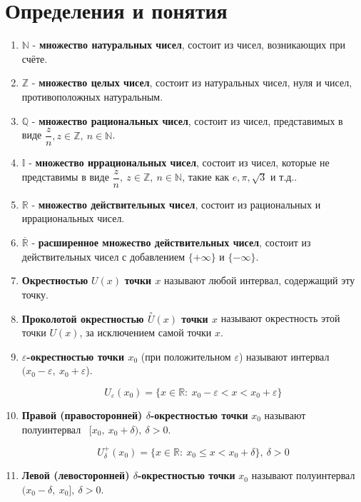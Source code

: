 

\renewcommand{\copyright}{fiixii, pluttan}
    
    
\toc 
\section*{Определения и понятия}
\begin{enumerate}

\item $\mathbb{N}$ - \textbf{множество натуральных чисел}, состоит из чисел, возникающих при счёте.
\item $\mathbb{Z}$ - \textbf{множество целых чисел}, состоит из натуральных чисел, нуля и чисел, противоположных натуральным.
\item $\mathbb{Q}$ - \textbf{множество рациональных чисел}, состоит из чисел, представимых в виде ${\dfrac{z}{n}}, z \in \mathbb{Z}, \ n \in \mathbb{N}$.
\item $\mathbb{I}$ - \textbf{множество иррациональных чисел}, состоит из чисел, которые не представимы в виде ${\dfrac{z}{n}}, \ z \in \mathbb{Z}, \ n \in \mathbb{N}$, такие как $e, \pi, \sqrt{3}$ и т.д..
\item $\mathbb{R}$ - \textbf{множество действительных чисел}, состоит из рациональных и иррациональных чисел.
\item $\overline{\mathbb{R}}$ - \textbf{расширенное множество действительных чисел}, состоит из действительных чисел с добавлением $\{+\infty\}$ и $\{-\infty\}$.
\item \textbf{Окрестностью} $U(x)$ \textbf{точки $x$} называют любой интервал, содержащий эту точку.
\item \textbf{Проколотой окрестностью $
\overset{\circ}U(x)$ точки $x$} называют окрестность этой точки $U(x)$, за исключением самой точки $x$.
\item \textbf{${\varepsilon}$-окрестностью точки $x_0$} (при положительном ${\varepsilon}$) называют интервал $(x_0-{\varepsilon}, \ x_0+{\varepsilon}$).

$$U_{\varepsilon}(x_0) = \{x \in \mathbb{R}: \ x_0 - {\varepsilon} < x < x_0 + {\varepsilon}\}
    $$
\item \textbf{Правой (правосторонней) $\delta$-окрестностью точки} $x_0$ называют полуинтервал \ $[x_0,\ x_0 + \delta), \ \delta > 0$.

$$U^+_{\delta}(x_0) = \{x \in \mathbb{R}: \ x_0 \leqslant x < x_0 + {\delta}\}, \ \delta > 0
    $$
\item \textbf{Левой (левосторонней) $\delta$-окрестностью точки} $x_0$ называют полуинтервал \ $(x_0 - \delta,\ x_0], \ \delta > 0$.


\end{enumerate}
